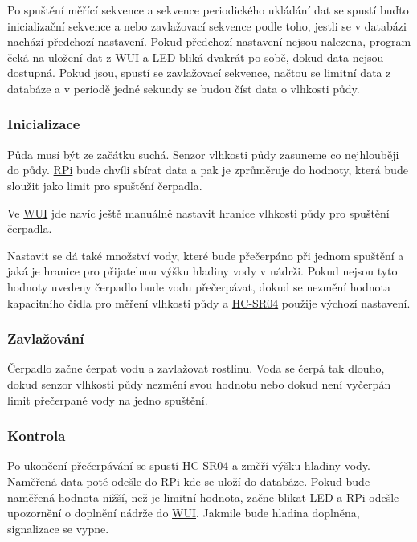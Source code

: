 \documentclass[12pt,a4paper]{article}
\begin{document}
Po spuštění měřící sekvence a sekvence periodického ukládání dat se spustí buďto inicializační sekvence a nebo zavlažovací sekvence podle toho, jestli se v databázi nachází předchozí nastavení. Pokud předchozí nastavení nejsou nalezena, program čeká na uložení dat z \space \underline{\ac{WUI}} a \ac{LED} bliká dvakrát po sobě, dokud data nejsou dostupná. Pokud jsou, spustí se zavlažovací sekvence, načtou se limitní data z databáze a v periodě jedné sekundy se budou číst data o vlhkosti půdy.

\subsubsection{Inicializace}

Půda musí být ze začátku suchá. Senzor vlhkosti půdy zasuneme co nejhlouběji do půdy. \underline{\ac{RPi}} bude chvíli sbírat data a pak je zprůměruje do hodnoty, která bude sloužit jako limit pro spuštění čerpadla.

Ve \underline{\ac{WUI}} jde navíc ještě manuálně nastavit hranice vlhkosti půdy pro spuštění čerpadla.

Nastavit se dá také množství vody, které bude přečerpáno při jednom spuštění a jaká je hranice pro přijatelnou výšku hladiny vody v nádrži. Pokud nejsou tyto hodnoty uvedeny čerpadlo bude vodu přečerpávat, dokud se nezmění hodnota kapacitního čidla pro měření vlhkosti půdy a \space \underline{\ac{HC-SR04}} použije výchozí nastavení.

\subsubsection{Zavlažování}

Čerpadlo začne čerpat vodu a zavlažovat rostlinu. Voda se čerpá tak dlouho, dokud senzor vlhkosti půdy nezmění svou hodnotu nebo dokud není vyčerpán limit přečerpané vody na jedno spuštění.

\subsubsection{Kontrola}

Po ukončení přečerpávání se spustí \underline{\ac{HC-SR04}} a změří výšku hladiny vody. Naměřená data poté odešle do \underline{\ac{RPi}} kde se uloží do databáze. Pokud bude naměřená hodnota nižší, než je limitní hodnota, začne blikat \underline{\ac{LED}} a \underline{\ac{RPi}} odešle upozornění o doplnění nádrže do \underline{\ac{WUI}}. Jakmile bude hladina doplněna, signalizace se vypne.
\end{document}
